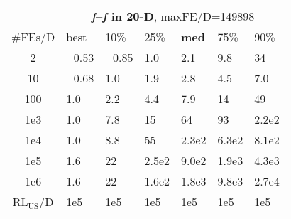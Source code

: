 \begin{tabular}{c|llllll}
 & \multicolumn{6}{|c}{\textbf{\textit{f}\raisebox{-0.35ex}{1}--\textit{f}\raisebox{-0.35ex}{24} in 20-D}, maxFE/D=149898}\\
\#FEs/D & best & 10\% & 25\% & \textbf{med} & 75\% & 90\%\\
2 & ~\,0.53 & ~\,0.85 & \hspace*{1ex}1.0 & \hspace*{1ex}2.1 & \hspace*{1ex}9.8 & 34\\
10 & ~\,0.68 & \hspace*{1ex}1.0 & \hspace*{1ex}1.9 & \hspace*{1ex}2.8 & \hspace*{1ex}4.5 & \hspace*{1ex}7.0\\
100 & \hspace*{1ex}1.0 & \hspace*{1ex}2.2 & \hspace*{1ex}4.4 & \hspace*{1ex}7.9 & 14 & 49\\
1e3 & \hspace*{1ex}1.0 & \hspace*{1ex}7.8 & 15 & 64 & 93 & 2.2e2\\
1e4 & \hspace*{1ex}1.0 & \hspace*{1ex}8.8 & 55 & 2.3e2 & 6.3e2 & 8.1e2\\
1e5 & \hspace*{1ex}1.6 & 22 & 2.5e2 & 9.0e2 & 1.9e3 & 4.3e3\\
1e6 & \hspace*{1ex}1.6 & 22 & 1.6e2 & 1.8e3 & 9.8e3 & 2.7e4\\
$\text{RL}_{\text{US}}$/D & 1e5 & 1e5 & 1e5 & 1e5 & 1e5 & 1e5
\end{tabular}
